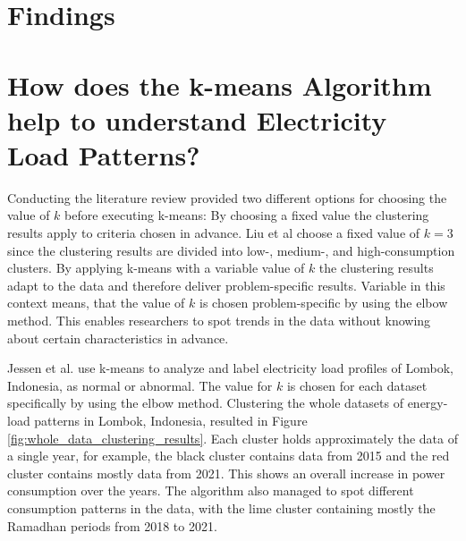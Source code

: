 \section{Findings}
\label{cha:findings}



\section{How does the k-means Algorithm help to understand Electricity Load Patterns?}
\label{sec:findings_understand_electricity_load_patterns}
Conducting the literature review provided two different options for choosing the value of $k$ before executing k-means:
By choosing a fixed value the clustering results apply to criteria chosen in advance.
Liu et al \cite{LIU-BDE} choose a fixed value of $k=3$ since the clustering results are divided into low-, medium-, and high-consumption clusters.
By applying k-means with a variable value of $k$ the clustering results adapt to the data and therefore deliver problem-specific results.
Variable in this context means, that the value of $k$ is chosen problem-specific by using the elbow method.
This enables researchers to spot trends in the data without knowing about certain characteristics in advance.

Jessen et al. \cite{JES-IND} use k-means to analyze and label electricity load profiles of Lombok, Indonesia, as normal or abnormal.
The value for $k$ is chosen for each dataset specifically by using the elbow method.
Clustering the whole datasets of energy-load patterns in Lombok, Indonesia, resulted in Figure \ref{fig:whole_data_clustering_results}.
Each cluster holds approximately the data of a single year, for example, the black cluster contains data from 2015 and the red cluster contains mostly data from 2021.
This shows an overall increase in power consumption over the years.
The algorithm also managed to spot different consumption patterns in the data, with the lime cluster containing mostly the Ramadhan periods from 2018 to 2021.

